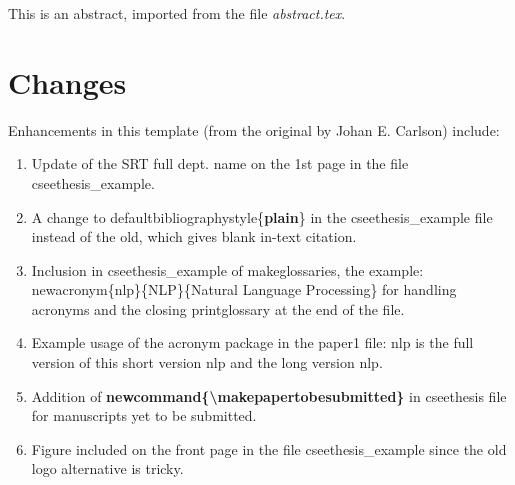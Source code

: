 This is an abstract, imported from the file \textit{abstract.tex}.


\section*{Changes}
Enhancements in this template (from the original by Johan E. Carlson) include:
\begin{enumerate}
    \item Update of the SRT full dept. name on the 1st page in the file cseethesis\_example.
    
    \item A change to defaultbibliographystyle\{\textbf{plain}\} in the cseethesis\_example file instead of the old, which gives blank in-text citation.
    
    \item Inclusion in cseethesis\_example of makeglossaries, the example: \\newacronym\{nlp\}\{NLP\}\{Natural Language Processing\} for handling acronyms and the closing printglossary at the end of the file.

    \item Example usage of the acronym package in the paper1 file: \acrfull{nlp} is the full version of this short version \acrshort{nlp} and the long version \acrlong{nlp}. 
    
    \item Addition of \textbf{newcommand\{\textbackslash makepapertobesubmitted\}} in cseethesis file for manuscripts yet to be submitted.
    
    \item Figure included on the front page in the file cseethesis\_example since the old logo alternative is tricky.
\end{enumerate}
